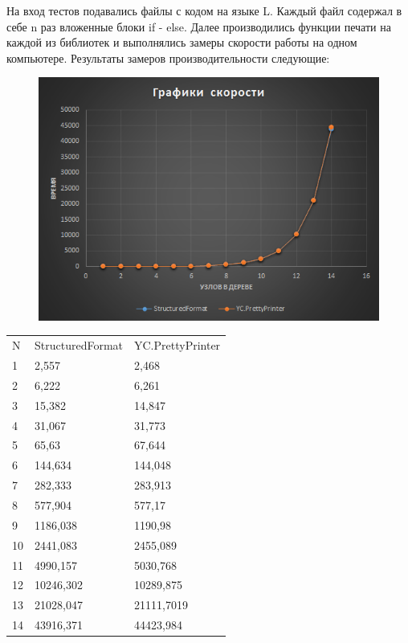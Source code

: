 \documentclass{matmex-diploma}
\begin{document}
На вход тестов подавались файлы с кодом на языке L. Каждый файл содержал в себе n раз вложенные блоки if - else. Далее производились функции печати на каждой из библиотек и выполнялись замеры скорости работы на одном компьютере. Результаты замеров производительности следующие:
\begin{figure}[h]
	\includegraphics[scale = 0.8]{Images/image04.png}
	\caption{}
\end{figure}
\begin{table}
    \begin{tabular}{lll}
    N  & StructuredFormat & YC.PrettyPrinter \\
    1  & 2,557            & 2,468            \\
    2  & 6,222            & 6,261            \\
    3  & 15,382           & 14,847           \\
    4  & 31,067           & 31,773           \\
    5  & 65,63            & 67,644           \\
    6  & 144,634          & 144,048          \\
    7  & 282,333          & 283,913          \\
    8  & 577,904          & 577,17           \\
    9  & 1186,038         & 1190,98          \\
    10 & 2441,083         & 2455,089         \\
    11 & 4990,157         & 5030,768         \\
    12 & 10246,302        & 10289,875        \\
    13 & 21028,047        & 21111,7019       \\
    14 & 43916,371        & 44423,984        \\
    \end{tabular}
\end{table}
\end{document}
